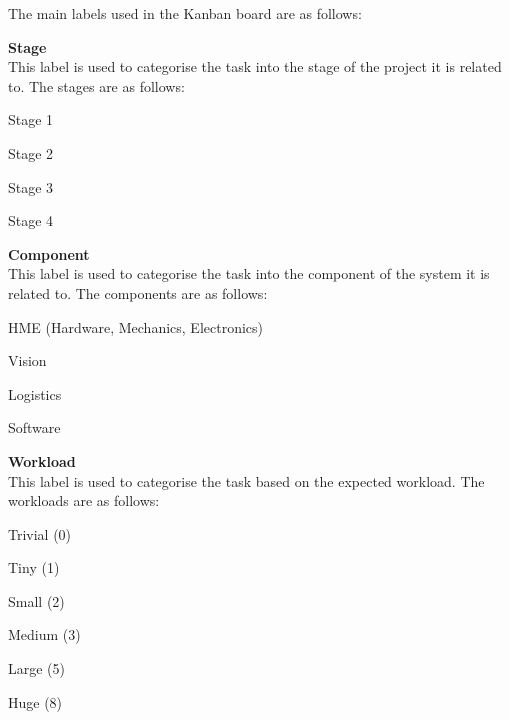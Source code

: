 \noindent
The main labels used in the Kanban board are as follows:
\begin{mylist}
  \item \textbf{Stage} \\
  This label is used to categorise the task into the stage of the project it is related to. The stages are as follows:
  \begin{multicols}{2}
    \vspace{-0.5em} 
    \begin{mylist}
      \item Stage 1
      \item Stage 2
      \item Stage 3
      \item Stage 4
    \end{mylist}
    \vspace{-0.5em} 
  \end{multicols}
  \item \textbf{Component} \\
  This label is used to categorise the task into the component of the system it is related to. The components are as follows:
  \begin{mylist}
    \item HME (Hardware, Mechanics, Electronics)
    \item Vision
    \item Logistics
    \item Software
  \end{mylist}
  \item \textbf{Workload} \\
  This label is used to categorise the task based on the expected workload. The workloads are as follows:
  \begin{multicols}{2}
    \vspace{-0.5em} 
    \begin{mylist}
      \item Trivial (0)
      \item Tiny (1)
      \item Small (2)
      \item Medium (3)
      \item Large (5)
      \item Huge (8)
    \end{mylist}
    \vspace{-0.5em} 
  \end{multicols}
\end{mylist}

